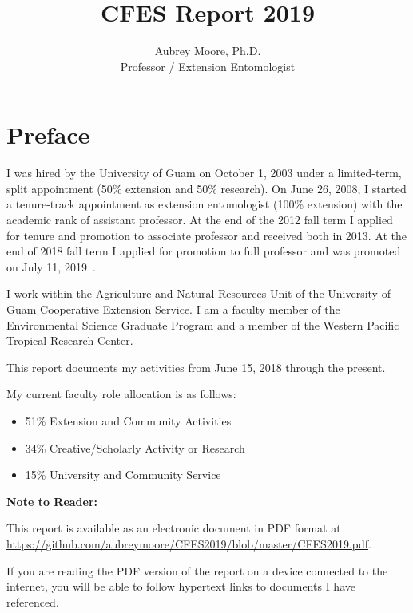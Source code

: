 \documentclass[12pt,english]{scrartcl}
\begin{document}
\title{CFES Report 2019}

\author{Aubrey Moore, Ph.D.\\
Professor / Extension Entomologist}

\maketitle



\tableofcontents{}

\clearpage

\section{Preface}
\begin{refsection}
	
I was hired by the University of Guam on October 1, 2003 under a limited-term,
split appointment (50\% extension and 50\% research). On June 26,
2008, I started a tenure-track appointment as extension entomologist
(100\% extension) with the academic rank of assistant professor. At
the end of the 2012 fall term I applied for tenure and promotion to associate professor and
received both in 2013. At the end of 2018 fall term I applied for promotion to
full professor and was promoted on July 11, 2019~\cite{recommendation_for_promotion2019}. 

I work within the Agriculture and Natural Resources Unit of the University
of Guam Cooperative Extension Service. I am a faculty member of the
Environmental Science Graduate Program and a member of the Western
Pacific Tropical Research Center. 

This report documents my activities from June 15, 2018 through the present.

My current faculty role allocation is as follows:
\begin{itemize}
	\item 51\% Extension and Community Activities 
	\item 34\% Creative/Scholarly Activity or Research 
	\item 15\% University and Community Service
\end{itemize}

\textbf{Note to Reader:}

This report is available as an electronic document in PDF format at\\
\url{https://github.com/aubreymoore/CFES2019/blob/master/CFES2019.pdf}. 

If you are reading the PDF version of the report on a device connected
to the internet, you will be able to follow hypertext links to documents
I have referenced.

\printbibliography

\end{refsection} 
\end{document}
